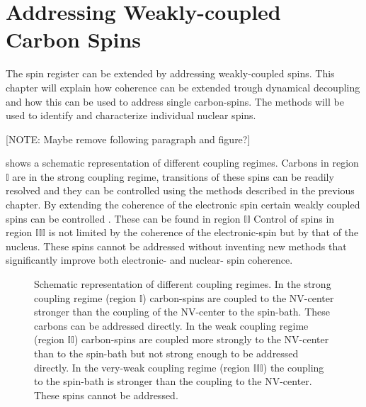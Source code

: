 
\chapter{Addressing Weakly-coupled Carbon Spins}
The spin register can be extended by addressing weakly-coupled spins.
This chapter will explain how coherence can be extended trough dynamical decoupling and how this can be used to address single carbon-spins.
The methods will be used to identify and characterize individual nuclear spins.

[NOTE: Maybe remove following paragraph and figure?]

 shows a schematic representation of different coupling regimes.
Carbons in region $\mathbb{I} $ are in the strong coupling regime, transitions of these spins can be readily resolved and they can be controlled using the methods described in the previous chapter.
By extending the coherence of the electronic spin certain weakly coupled spins can be controlled \citep{Taminiau2012Detection}.
These can be found in region $\mathbb{II}$
Control of spins in region $\mathbb{III}$ is not limited by the coherence of the electronic-spin but by that of the nucleus.
These spins cannot be addressed without inventing new methods that significantly improve both electronic- and nuclear- spin coherence.


\begin{figure}[htbp]
\centering
    \caption{ Schematic representation of different coupling regimes. In the strong coupling regime (region $\mathbb{I}$) carbon-spins are coupled to the NV-center stronger than the coupling of the NV-center to the spin-bath. These carbons can be addressed directly. In the weak coupling regime (region $\mathbb{II}$) carbon-spins are coupled more strongly to the NV-center than to the spin-bath but not strong enough to be addressed directly. In the very-weak coupling regime (region $\mathbb{III}$) the coupling to the spin-bath is stronger than the coupling to the NV-center. These spins cannot be addressed.}
    \label{fig:coupling regimes}
\end{figure}



